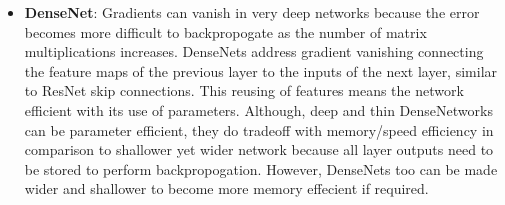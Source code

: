 \begin{itemize}
    \item \textbf{DenseNet}: Gradients can vanish in very deep networks because the error becomes more
        difficult to backpropogate as the number of matrix multiplications increases. DenseNets address 
        gradient vanishing connecting the feature maps of the previous layer to the inputs of the next 
        layer, similar to ResNet skip connections. This reusing of features means the network efficient 
        with its use of parameters. Although, deep and thin DenseNetworks can be parameter efficient, they 
        do tradeoff with memory/speed efficiency in comparison to shallower yet wider network because all 
        layer outputs need to be stored to perform backpropogation. However, DenseNets too can be made 
        wider and shallower to become more memory effecient if required.
\end{itemize}

